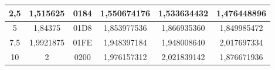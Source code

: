 \begin{table}[H]
\begin{tabular}{|c|cc|ccc|}
2,5                               & \multicolumn{1}{c|}{1,515625}                                 & 0184                                      & \multicolumn{1}{c|}{1,550674176}      & \multicolumn{1}{c|}{1,533634432}      & 1,476448896      \\ \hline
5                                 & \multicolumn{1}{c|}{1,84375}                                  & 01D8                                      & \multicolumn{1}{c|}{1,853977536}      & \multicolumn{1}{c|}{1,866935360}      & 1,849985472      \\ \hline
7,5                               & \multicolumn{1}{c|}{1,9921875}                                & 01FE                                      & \multicolumn{1}{c|}{1,948397184}      & \multicolumn{1}{c|}{1,948008640}      & 2,017697334      \\ \hline
10                                & \multicolumn{1}{c|}{2}                                        & 0200                                      & \multicolumn{1}{c|}{1,976157312}      & \multicolumn{1}{c|}{2,021839142}      & 1,876671936      \\ \hline
\end{tabular}
\end{table}


